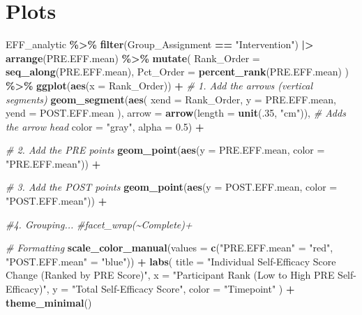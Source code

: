 \documentclass[
]{article}
\newenvironment{Shaded}{\begin{snugshade}}{\end{snugshade}}
\newcommand{\AttributeTok}[1]{\textcolor[rgb]{0.13,0.29,0.53}{#1}}
\newcommand{\CommentTok}[1]{\textcolor[rgb]{0.56,0.35,0.01}{\textit{#1}}}
\newcommand{\DecValTok}[1]{\textcolor[rgb]{0.00,0.00,0.81}{#1}}
\newcommand{\FloatTok}[1]{\textcolor[rgb]{0.00,0.00,0.81}{#1}}
\newcommand{\FunctionTok}[1]{\textcolor[rgb]{0.13,0.29,0.53}{\textbf{#1}}}
\newcommand{\NormalTok}[1]{#1}
\newcommand{\OtherTok}[1]{\textcolor[rgb]{0.56,0.35,0.01}{#1}}
\newcommand{\SpecialCharTok}[1]{\textcolor[rgb]{0.81,0.36,0.00}{\textbf{#1}}}
\newcommand{\StringTok}[1]{\textcolor[rgb]{0.31,0.60,0.02}{#1}}
\begin{document}
\section{Plots}\label{plots}

\begin{Shaded}
\begin{Highlighting}[]
\NormalTok{EFF\_analytic }\SpecialCharTok{\%\textgreater{}\%} 
  \FunctionTok{filter}\NormalTok{(Group\_Assignment }\SpecialCharTok{==} \StringTok{"Intervention"}\NormalTok{) }\SpecialCharTok{|\textgreater{}} 
  \FunctionTok{arrange}\NormalTok{(PRE.EFF.mean) }\SpecialCharTok{\%\textgreater{}\%} 
  \FunctionTok{mutate}\NormalTok{(}
    \AttributeTok{Rank\_Order =} \FunctionTok{seq\_along}\NormalTok{(PRE.EFF.mean),}
    \AttributeTok{Pct\_Order =} \FunctionTok{percent\_rank}\NormalTok{(PRE.EFF.mean)}
\NormalTok{  ) }\SpecialCharTok{\%\textgreater{}\%} 
  \FunctionTok{ggplot}\NormalTok{(}\FunctionTok{aes}\NormalTok{(}\AttributeTok{x =}\NormalTok{ Rank\_Order)) }\SpecialCharTok{+}
  \CommentTok{\# 1. Add the arrows (vertical segments)}
  \FunctionTok{geom\_segment}\NormalTok{(}\FunctionTok{aes}\NormalTok{(}
    \AttributeTok{xend =}\NormalTok{ Rank\_Order, }
    \AttributeTok{y =}\NormalTok{ PRE.EFF.mean, }
    \AttributeTok{yend =}\NormalTok{ POST.EFF.mean}
\NormalTok{  ), }
  \AttributeTok{arrow =} \FunctionTok{arrow}\NormalTok{(}\AttributeTok{length =} \FunctionTok{unit}\NormalTok{(.}\DecValTok{35}\NormalTok{, }\StringTok{"cm"}\NormalTok{)), }\CommentTok{\# Adds the arrow head}
  \AttributeTok{color =} \StringTok{"gray"}\NormalTok{, }
  \AttributeTok{alpha =} \FloatTok{0.5}\NormalTok{) }\SpecialCharTok{+}
  
  \CommentTok{\# 2. Add the PRE points}
  \FunctionTok{geom\_point}\NormalTok{(}\FunctionTok{aes}\NormalTok{(}\AttributeTok{y =}\NormalTok{ PRE.EFF.mean, }\AttributeTok{color =} \StringTok{"PRE.EFF.mean"}\NormalTok{)) }\SpecialCharTok{+}
  
  \CommentTok{\# 3. Add the POST points}
  \FunctionTok{geom\_point}\NormalTok{(}\FunctionTok{aes}\NormalTok{(}\AttributeTok{y =}\NormalTok{ POST.EFF.mean, }\AttributeTok{color =} \StringTok{"POST.EFF.mean"}\NormalTok{)) }\SpecialCharTok{+}
  
  \CommentTok{\#4. Grouping...}
  \CommentTok{\#facet\_wrap(\textasciitilde{}Complete)+}
  
  \CommentTok{\# Formatting}
  \FunctionTok{scale\_color\_manual}\NormalTok{(}\AttributeTok{values =} \FunctionTok{c}\NormalTok{(}\StringTok{"PRE.EFF.mean"} \OtherTok{=} \StringTok{"red"}\NormalTok{, }\StringTok{"POST.EFF.mean"} \OtherTok{=} \StringTok{"blue"}\NormalTok{)) }\SpecialCharTok{+}
  \FunctionTok{labs}\NormalTok{(}
    \AttributeTok{title =} \StringTok{"Individual Self{-}Efficacy Score Change (Ranked by PRE Score)"}\NormalTok{,}
    \AttributeTok{x =} \StringTok{"Participant Rank (Low to High PRE Self{-}Efficacy)"}\NormalTok{,}
    \AttributeTok{y =} \StringTok{"Total Self{-}Efficacy Score"}\NormalTok{,}
    \AttributeTok{color =} \StringTok{"Timepoint"}
\NormalTok{  ) }\SpecialCharTok{+}
  \FunctionTok{theme\_minimal}\NormalTok{()}
\end{Highlighting}
\end{Shaded}
\end{document}
